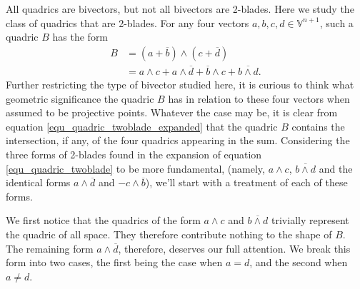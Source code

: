 \documentclass{ecgd-l}
\theoremstyle{definition}
\theoremstyle{remark}
\numberwithin{equation}{section}
\newcommand{\V}{\mathbb{V}}
\begin{document}
All quadrics are bivectors, but not all bivectors are 2-blades.  Here
we study the class of quadrics that are 2-blades.  For any four
vectors $a,b,c,d\in\V^{n+1}$, such a quadric $B$ has the form
\begin{align}
B &= (a+\overline{b})\wedge(c+\overline{d})\label{equ_quadric_twoblade} \\
 &= a\wedge c + a\wedge\overline{d} + \overline{b}\wedge c + \overline{b\wedge d}.\label{equ_quadric_twoblade_expanded}
\end{align}
Further restricting the type of bivector studied here,
it is curious to think what geometric significance the quadric $B$ has in relation
to these four vectors when assumed to be projective points.  Whatever the case may be, it is clear from equation
\eqref{equ_quadric_twoblade_expanded} that the quadric $B$ contains the intersection, if any,
of the four quadrics appearing in the sum.  Considering the three forms of 2-blades
found in the expansion of equation \eqref{equ_quadric_twoblade} to be more
fundamental, (namely, $a\wedge c$, $\overline{b\wedge d}$ and
the identical forms $a\wedge\overline{d}$ and $-c\wedge\overline{b}$), we'll
start with a treatment of each of these forms.

We first notice that the quadrics of the form $a\wedge c$ and $\overline{b\wedge d}$
trivially represent the quadric of all space.  They therefore contribute nothing
to the shape of $B$.  The remaining form $a\wedge\overline{d}$, therefore,
deserves our full attention.  We break this form into two cases, the first being
the case when $a=d$, and the second when $a\neq d$.
\end{document}
